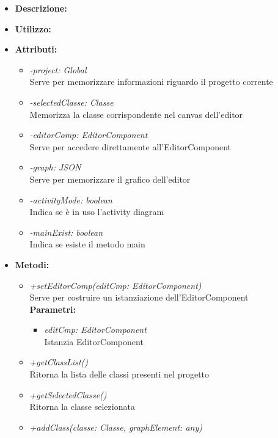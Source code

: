 \begin{itemize}
	\item \textbf{Descrizione:}\\
	
	\item \textbf{Utilizzo:}\\
	
	\item \textbf{Attributi:}
		\begin{itemize}
			\item \emph{-project: Global}\\
			Serve per memorizzare informazioni riguardo il progetto corrente
			\item \emph{-selectedClasse: Classe}\\
			Memorizza la classe corrispondente nel canvas dell'editor
			\item \emph{-editorComp: EditorComponent}\\
			Serve per accedere direttamente all'EditorComponent
			\item \emph{-graph: JSON}\\
			Serve per memorizzare il grafico dell'editor
			\item \emph{-activityMode: boolean}\\
			Indica se è in uso l'activity diagram
			\item \emph{-mainExist: boolean}\\
			Indica se esiste il metodo main
		\end{itemize}
	\item \textbf{Metodi:}
		\begin{itemize}
			\item \emph{+setEditorComp(editCmp: EditorComponent)}\\
    		Serve per costruire un istanziazione dell'EditorComponent\\
    		\textbf{Parametri:}
    		\begin{itemize}
    			\item \emph{editCmp: EditorComponent}\\
    			Istanzia EditorComponent
    		\end{itemize}
    		\item \emph{+getClassList()}\\
    		Ritorna la lista delle classi presenti nel progetto
    		\item \emph{+getSelectedClasse()}\\
    		Ritorna la classe selezionata
    		\item \emph{+addClass(classe: Classe, graphElement: any)}\\

\end{itemize}
\end{itemize}

